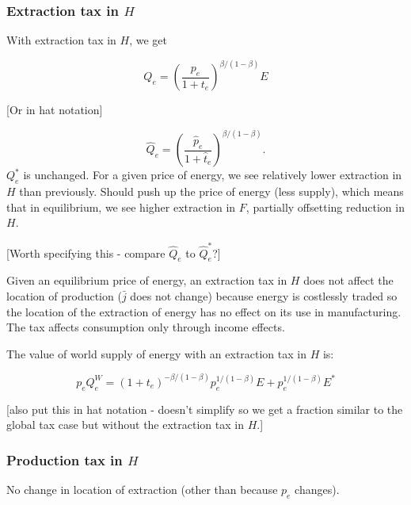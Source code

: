 \documentclass[notitlepage,12pt]{article}
\begin{document}
\subsubsection{Extraction tax in $H$}

With extraction tax in $H$, we get

\begin{equation*}
Q_{e}=\left( \frac{p_{e}}{1+t_{e}}\right) ^{\beta /\left( 1-\beta \right) }E
\end{equation*}

[Or in hat notation]

\begin{equation*}
\hat{Q}_{e}=\left( \frac{\hat{p}_{e}}{1+\hat{t}_{e}}\right) ^{\beta /\left(
1-\beta \right) }.
\end{equation*}%
$Q_{e}^{\ast }$ is unchanged. For a given price of energy, we see relatively
lower extraction in $H$ than previously. Should push up the price of energy
(less supply), which means that in equilibrium, we see higher extraction in $%
F$, partially offsetting reduction in $H$.

[Worth specifying this - compare $\hat{Q}_{e}$ to $\hat{Q}_{e}^{\ast }$?]

Given an equilibrium price of energy, an extraction tax in $H$ does not
affect the location of production ($\bar{j}$ does not change) because energy
is costlessly traded so the location of the extraction of energy has no
effect on its use in manufacturing. The tax affects consumption only through
income effects.

The value of world supply of energy with an extraction tax in $H$ is:

\begin{equation}
p_{e}Q_{e}^{W}=\left( 1+t_{e}\right) ^{-\beta /\left( 1-\beta \right)
}p_{e}^{1/\left( 1-\beta \right) }E+p_{e}^{1/\left( 1-\beta \right) }E^{\ast
}  \label{Supply of energy with extraction tax in H}
\end{equation}

[also put this in hat notation - doesn't simplify so we get a fraction
similar to the global tax case but without the extraction tax in $H$.]

\subsubsection{Production tax in $H$}

No change in location of extraction (other than because $p_{e}$ changes).
\end{document}
